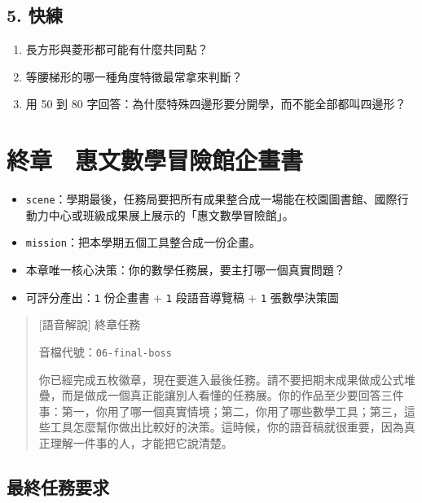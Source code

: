 \documentclass[
  chinese,
  12pt,
  a4paper,
  oneside]{article}
\providecommand{\tightlist}{%
  \setlength{\itemsep}{0pt}\setlength{\parskip}{0pt}}
\begin{document}
\subsection{5. 快練}\label{ux5febux7df4-5}

\begin{enumerate}
\def\labelenumi{\arabic{enumi}.}
\tightlist
\item
  長方形與菱形都可能有什麼共同點？
\item
  等腰梯形的哪一種角度特徵最常拿來判斷？
\item
  用 50 到 80 字回答：為什麼特殊四邊形要分開學，而不能全部都叫四邊形？
\end{enumerate}

\newpage

\section{終章　惠文數學冒險館企畫書}\label{ux7d42ux7ae0-ux60e0ux6587ux6578ux5b78ux5192ux96aaux9928ux4f01ux756bux66f8}

\begin{itemize}
\tightlist
\item
  \texttt{scene}：學期最後，任務局要把所有成果整合成一場能在校園圖書館、國際行動力中心或班級成果展上展示的「惠文數學冒險館」。
\item
  \texttt{mission}：把本學期五個工具整合成一份企畫。
\item
  本章唯一核心決策：你的數學任務展，要主打哪一個真實問題？
\item
  可評分產出：\texttt{1} 份企畫書 + \texttt{1} 段語音導覽稿 + \texttt{1}
  張數學決策圖
\end{itemize}

\begin{quote}
{[}語音解說{]} 終章任務

音檔代號：\texttt{06-final-boss}

你已經完成五枚徽章，現在要進入最後任務。請不要把期末成果做成公式堆疊，而是做成一個真正能讓別人看懂的任務展。你的作品至少要回答三件事：第一，你用了哪一個真實情境；第二，你用了哪些數學工具；第三，這些工具怎麼幫你做出比較好的決策。這時候，你的語音稿就很重要，因為真正理解一件事的人，才能把它說清楚。
\end{quote}

\subsection{最終任務要求}\label{ux6700ux7d42ux4efbux52d9ux8981ux6c42}
\end{document}
